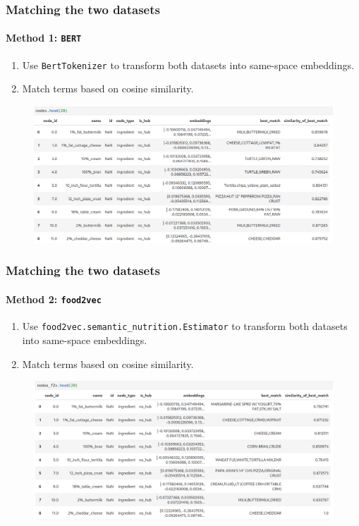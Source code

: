 \documentclass{beamer}
\begin{document}
\begin{frame}
	\frametitle{Matching the two datasets}
	\framesubtitle{Method 1: \texttt{BERT}}
	\begin{enumerate}
		\item Use \texttt{BertTokenizer} to transform both datasets into
			same-space embeddings.
		\item Match terms based on cosine similarity.
	\end{enumerate}
	\begin{figure}[H]
		\centering
		\includegraphics[width=\linewidth]{img/match_bert_head.png}
	\end{figure}
\end{frame}

\begin{frame}
	\frametitle{Matching the two datasets}
	\framesubtitle{Method 2: \texttt{food2vec}}
	\begin{enumerate}
		\item Use \texttt{food2vec.semantic\_nutrition.Estimator} to transform
			both datasets into same-space embeddings.
		\item Match terms based on cosine similarity.
	\end{enumerate}
	\begin{figure}[H]
		\centering
		\includegraphics[width=\linewidth]{img/match_f2v_head.png}
	\end{figure}
\end{frame}
\end{document}
